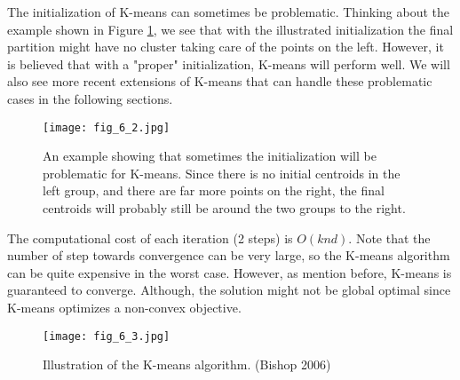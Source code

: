 \documentclass[../main.tex]{subfiles}
\begin{document}
\begin{remark}
	The initialization of K-means can sometimes be problematic. Thinking about the example shown in Figure \ref{fig_6_2}, we see that with the illustrated initialization the final partition might have no cluster taking care of the points on the left. However, it is believed that with a "proper" initialization, K-means will perform well. We will also see more recent extensions of K-means that can handle these problematic cases in the following sections.
	\begin{figure}[h] 
		\centering 
		\texttt{[image: fig\_6\_2.jpg]} 
		\caption{An example showing that sometimes the initialization will be problematic for K-means. Since there is no initial centroids in the left group, and there are far more points on the right, the final centroids will probably still be around the two groups to the right.}\label{fig_6_2}
	\end{figure}
\end{remark}
\par The computational cost of each iteration (2 steps) is $O(knd)$. Note that the number of step towards convergence can be very large, so the K-means algorithm can be quite expensive in the worst case. However, as mention before, K-means is guaranteed to converge. Although, the solution might not be global optimal since K-means optimizes a non-convex objective.
\begin{figure}[t] 
	\centering 
	\texttt{[image: fig\_6\_3.jpg]} 
	\caption{Illustration of the K-means algorithm. (Bishop 2006)}\label{fig_6_3}
\end{figure}
\end{document}
